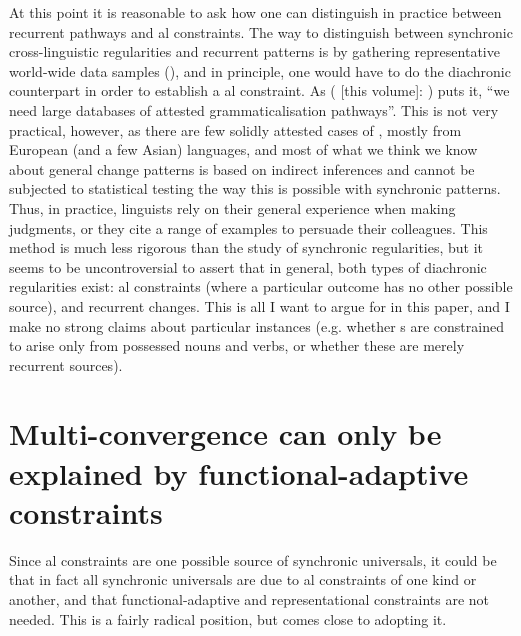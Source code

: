\documentclass[output=paper]{langsci/langscibook}
\begin{document}
At this point it is reasonable to ask how one can distinguish in practice between recurrent pathways and al constraints. The way to distinguish between synchronic cross-linguistic regularities and recurrent patterns is by gathering representative world-wide data samples (), and in principle, one would have to do the diachronic counterpart in order to establish a al constraint. As \citeauthor{chapters/collins} (\citeyear{chapters/collins} [this volume]: \pageref{pg:collins:refforhaspelmath}) puts it, “we need large databases of attested grammaticalisation pathways”. This is not very practical, however, as there are few solidly attested cases of , mostly from European (and a few Asian) languages, and most of what we think we know about general change patterns is based on indirect inferences and cannot be subjected to statistical testing the way this is possible with synchronic patterns. Thus, in practice, linguists rely on their general experience when making judgments, or they cite a range of examples to persuade their colleagues. This method is much less rigorous than the study of synchronic regularities, but it seems to be uncontroversial to assert that in general, both types of diachronic regularities exist: al constraints (where a particular outcome has no other possible source), and recurrent changes. This is all I want to argue for in this paper, and I make no strong claims about particular instances (e.g. whether s are constrained to arise only from possessed nouns and  verbs, or whether these are merely recurrent sources).
 

\section{Multi-convergence can only be explained by functional-adaptive constraints}\label{sec:haspelmath:5}

Since al constraints are one possible source of synchronic universals, it could be that in fact all synchronic universals are due to al constraints of one kind or another, and that functional-adaptive and representational constraints are not needed. This is a fairly radical position, but \citet{Cristofaro2017} comes close to adopting it.
\end{document}
